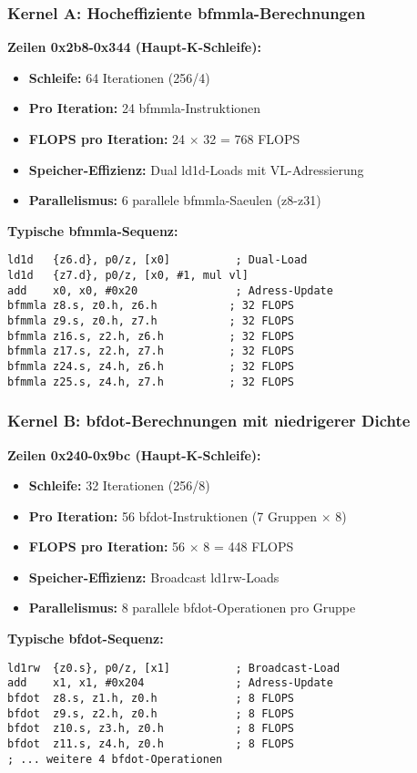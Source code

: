 \documentclass[11pt,a4paper]{article}
\begin{document}
\subsubsection{Kernel A: Hocheffiziente bfmmla-Berechnungen}

\textbf{Zeilen 0x2b8-0x344 (Haupt-K-Schleife):}
\begin{itemize}
\item \textbf{Schleife:} 64 Iterationen (256/4)
\item \textbf{Pro Iteration:} 24 bfmmla-Instruktionen
\item \textbf{FLOPS pro Iteration:} 24 $\times$ 32 = 768 FLOPS
\item \textbf{Speicher-Effizienz:} Dual ld1d-Loads mit VL-Adressierung
\item \textbf{Parallelismus:} 6 parallele bfmmla-Saeulen (z8-z31)
\end{itemize}

\textbf{Typische bfmmla-Sequenz:}
\begin{verbatim}
ld1d   {z6.d}, p0/z, [x0]          ; Dual-Load
ld1d   {z7.d}, p0/z, [x0, #1, mul vl]
add    x0, x0, #0x20               ; Adress-Update
bfmmla z8.s, z0.h, z6.h           ; 32 FLOPS
bfmmla z9.s, z0.h, z7.h           ; 32 FLOPS  
bfmmla z16.s, z2.h, z6.h          ; 32 FLOPS
bfmmla z17.s, z2.h, z7.h          ; 32 FLOPS
bfmmla z24.s, z4.h, z6.h          ; 32 FLOPS
bfmmla z25.s, z4.h, z7.h          ; 32 FLOPS
\end{verbatim}

\subsubsection{Kernel B: bfdot-Berechnungen mit niedrigerer Dichte}

\textbf{Zeilen 0x240-0x9bc (Haupt-K-Schleife):}
\begin{itemize}
\item \textbf{Schleife:} 32 Iterationen (256/8)
\item \textbf{Pro Iteration:} 56 bfdot-Instruktionen (7 Gruppen $\times$ 8)
\item \textbf{FLOPS pro Iteration:} 56 $\times$ 8 = 448 FLOPS
\item \textbf{Speicher-Effizienz:} Broadcast ld1rw-Loads 
\item \textbf{Parallelismus:} 8 parallele bfdot-Operationen pro Gruppe
\end{itemize}

\textbf{Typische bfdot-Sequenz:}
\begin{verbatim}
ld1rw  {z0.s}, p0/z, [x1]          ; Broadcast-Load
add    x1, x1, #0x204              ; Adress-Update
bfdot  z8.s, z1.h, z0.h            ; 8 FLOPS
bfdot  z9.s, z2.h, z0.h            ; 8 FLOPS
bfdot  z10.s, z3.h, z0.h           ; 8 FLOPS
bfdot  z11.s, z4.h, z0.h           ; 8 FLOPS
; ... weitere 4 bfdot-Operationen
\end{verbatim}
\end{document}
